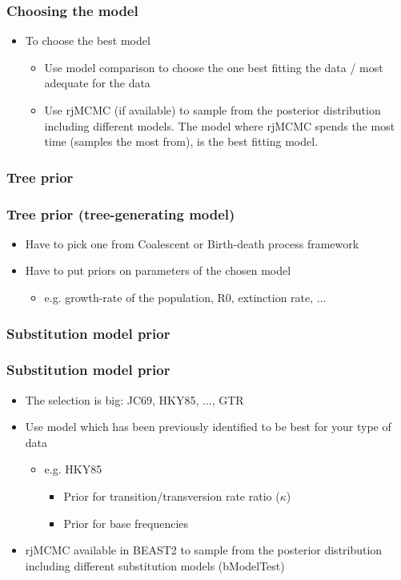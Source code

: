 \begin{frame}\frametitle{Choosing the model}
	\begin{itemize}
		\item To choose the best model
		\begin{itemize}
			\item Use model comparison to choose the one best fitting the data / most adequate for the data
			\item Use rjMCMC (if available) to sample from the posterior distribution including different models. The model where rjMCMC spends the most time (samples the most from), is the best fitting model. 
		\end{itemize}

	\end{itemize}
\end{frame}

\subsubsection{Tree prior}
\begin{frame}\frametitle{Tree prior (tree-generating model)}
	\begin{itemize}
		\item Have to pick one from Coalescent or Birth-death process framework
		\item Have to put priors on parameters of the chosen model
		\begin{itemize}
			\item e.g. growth-rate of the population, R0, extinction rate, ...
		\end{itemize}
	\end{itemize}
\end{frame}

\subsubsection{Substitution model prior}
\begin{frame}\frametitle{Substitution model prior}
	\begin{itemize}
		\item The selection is big: JC69, HKY85, ..., GTR
		\item Use model which has been previously identified to be best for your type of data
		\begin{itemize}
			\item e.g. HKY85			
			\begin{itemize}
				\item Prior for transition/transversion rate ratio ($\kappa$) %
				\item Prior for base frequencies%
			\end{itemize}	
		\end{itemize}
		\item rjMCMC available in BEAST2 to sample from the posterior distribution including different substitution models (bModelTest)
	\end{itemize}
\end{frame}

